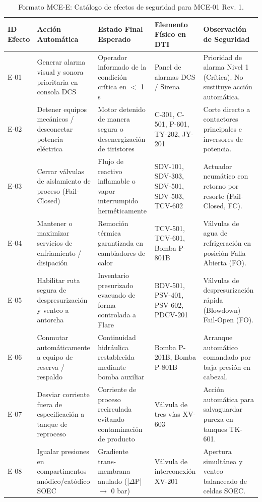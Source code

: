 \documentclass[10pt,letterpaper]{article}
\begin{document}
\begin{table}[H]
\centering\footnotesize
\caption{Formato MCE-E: Catálogo de efectos de seguridad para MCE-01 Rev. 1.} \label{tab:mcee_tabla}
\begin{tabularx}{\textwidth}{|l|p{3.5cm}|p{3.5cm}|p{3.2cm}|X|}
\hline
\rowcolor{tableheader}\color{white}\textbf{ID Efecto} & \color{white}\textbf{Acción Automática} & \color{white}\textbf{Estado Final Esperado} & \color{white}\textbf{Elemento Físico en DTI} & \color{white}\textbf{Observación de Seguridad} \\ \hline
E-01 & Generar alarma visual y sonora prioritaria en consola DCS & Operador informado de la condición crítica en $<$ 1 s & Panel de alarmas DCS / Sirena & Prioridad de alarma Nivel 1 (Crítica). No sustituye acción automática. \\ \hline
E-02 & Detener equipos mecánicos / desconectar potencia eléctrica & Motor detenido de manera segura o desenergización de tiristores & C-301, C-501, P-601, TY-202, JY-201 & Corte directo a contactores principales e inversores de potencia. \\ \hline
E-03 & Cerrar válvulas de aislamiento de proceso (Fail-Closed) & Flujo de reactivo inflamable o vapor interrumpido herméticamente & SDV-101, SDV-303, SDV-501, SDV-503, TCV-602 & Actuador neumático con retorno por resorte (Fail-Closed, FC). \\ \hline
E-04 & Mantener o maximizar servicios de enfriamiento / disipación & Remoción térmica garantizada en cambiadores de calor & TCV-501, TCV-601, Bomba P-801B & Válvulas de agua de refrigeración en posición Falla Abierta (FO). \\ \hline
E-05 & Habilitar ruta segura de despresurización y venteo a antorcha & Inventario presurizado evacuado de forma controlada a Flare & BDV-501, PSV-401, PSV-602, PDCV-201 & Válvulas de despresurización rápida (Blowdown) Fail-Open (FO). \\ \hline
E-06 & Conmutar automáticamente a equipo de reserva / respaldo & Continuidad hidráulica restablecida mediante bomba auxiliar & Bomba P-201B, Bomba P-801B & Arranque automático comandado por baja presión en cabezal. \\ \hline
E-07 & Desviar corriente fuera de especificación a tanque de reproceso & Corriente de proceso recirculada evitando contaminación de producto & Válvula de tres vías XV-603 & Acción automática para salvaguardar pureza en tanques TK-601. \\ \hline
E-08 & Igualar presiones en compartimentos anódico/catódico SOEC & Gradiente trans-membrana anulado (|$\Delta$P| $\to$ 0 bar) & Válvula de interconexión XV-201 & Apertura simultánea y venteo balanceado de celdas SOEC. \\ \hline
\end{tabularx}
\end{table}
\end{document}
